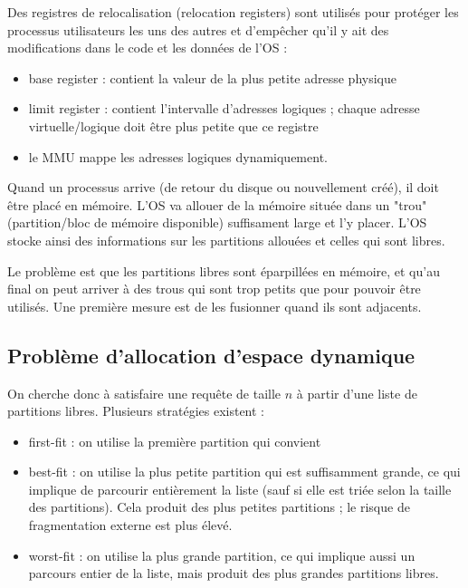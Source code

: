 Des registres de relocalisation (relocation registers) sont utilisés pour protéger les processus utilisateurs les uns des autres et d'empêcher qu'il y ait des modifications dans le code et les données de l'OS :

\begin{itemize}
	\item base register : contient la valeur de la plus petite adresse physique
	\item limit register : contient l'intervalle d'adresses logiques ; chaque adresse virtuelle/logique doit être plus petite que ce registre
	\item le MMU mappe les adresses logiques dynamiquement.
\end{itemize}


Quand un processus arrive (de retour du disque ou nouvellement créé), il doit être placé en mémoire. L'OS va allouer de la mémoire située dans un "trou" (partition/bloc de mémoire disponible) suffisament large et l'y placer. L'OS stocke ainsi des informations sur les partitions allouées et celles qui sont libres.

Le problème est que les partitions libres sont éparpillées en mémoire, et qu'au final on peut arriver à des trous qui sont trop petits que pour pouvoir être utilisés. Une première mesure est de les fusionner quand ils sont adjacents.


	\subsection{Problème d'allocation d'espace dynamique}
	
	On cherche donc à satisfaire une requête de taille $n$ à partir d'une liste de partitions libres. Plusieurs stratégies existent :
	
	\begin{itemize}
		\item first-fit : on utilise la première partition qui convient
		\item best-fit : on utilise la plus petite partition qui est suffisamment grande, ce qui implique de parcourir entièrement la liste (sauf si elle est triée selon la taille des partitions). Cela produit des plus petites partitions ; le risque de fragmentation externe est plus élevé.
		
		\item worst-fit : on utilise la plus grande partition, ce qui implique aussi un parcours entier de la liste, mais produit des plus grandes partitions libres.
	\end{itemize}
	
